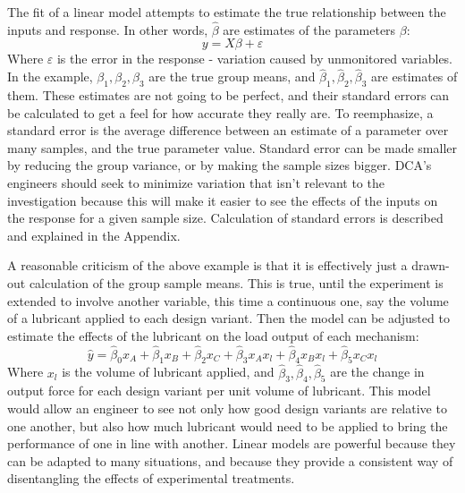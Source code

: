 \documentclass[11pt,a4paper,article]{memoir} %
\begin{document}
The fit of a linear model attempts to estimate the true relationship between the inputs and response. In other words, $\hat{\beta}$ are estimates of the parameters $\beta$:
\begin{equation}
	y = X\beta + \varepsilon
\end{equation}
Where $\varepsilon$ is the error in the response - variation caused by unmonitored variables. In the example, $\beta_1, \beta_2, \beta_3$ are the true group means, and $\hat{\beta}_1, \hat{\beta}_2, \hat{\beta}_3$ are estimates of them. These estimates are not going to be perfect, and their standard errors can be calculated to get a feel for how accurate they really are. To reemphasize, a standard error is the average difference between an estimate of a parameter over many samples, and the true parameter value. Standard error can be made smaller by reducing the group variance, or by making the sample sizes bigger.  DCA's engineers should seek to minimize variation that isn't relevant to the investigation because this will make it easier to see the effects of the inputs on the response for a given sample size. Calculation of standard errors is described and explained in the Appendix.

A reasonable criticism of the above example is that it is effectively just a drawn-out calculation of the group sample means. This is true, until the experiment is extended to involve another variable, this time a continuous one, say the volume of a lubricant applied to each design variant. Then the model can be adjusted to estimate the effects of the lubricant on the load output of each mechanism:
\begin{equation}
	\hat{y} = \hat{\beta}_0 x_A + \hat{\beta}_{1}x_B + \hat{\beta}_{2}x_C + \hat{\beta}_3 x_A x_l + \hat{\beta}_4 x_B x_l + \hat{\beta}_5 x_C x_l
\end{equation}
Where $x_l$ is the volume of lubricant applied, and $\hat{\beta}_3, \hat{\beta}_4, \hat{\beta}_5$ are the change in output force for each design variant per unit volume of lubricant. This model would allow an engineer to see not only how good design variants are relative to one another, but also how much lubricant would need to be applied to bring the performance of one in line with another. Linear models are powerful because they can be adapted to many situations, and because they provide a consistent way of disentangling the effects of experimental treatments.
\end{document}

